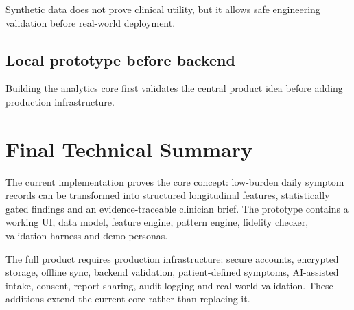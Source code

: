 \documentclass[11pt,a4paper]{article}
\begin{document}
Synthetic data does not prove clinical utility, but it allows safe engineering validation before real-world deployment.

\subsection{Local prototype before backend}

Building the analytics core first validates the central product idea before adding production infrastructure.

\section{Final Technical Summary}

\begin{implbox}
The current implementation proves the core concept: low-burden daily symptom records can be transformed into structured longitudinal features, statistically gated findings and an evidence-traceable clinician brief. The prototype contains a working UI, data model, feature engine, pattern engine, fidelity checker, validation harness and demo personas.
\end{implbox}

\begin{futurebox}
The full product requires production infrastructure: secure accounts, encrypted storage, offline sync, backend validation, patient-defined symptoms, AI-assisted intake, consent, report sharing, audit logging and real-world validation. These additions extend the current core rather than replacing it.
\end{futurebox}
\end{document}
